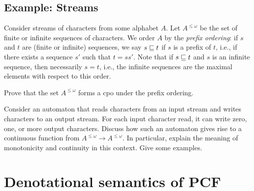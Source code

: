 \documentclass{article}
\begin{document}
\subsection{Example: Streams}

Consider streams of characters from some alphabet $A$. Let
$A^{\leq\omega}$ be the set of finite or infinite sequences of
characters. We order $A$ by the {\em prefix ordering}: if $s$ and $t$
are (finite or infinite) sequences, we say $s\sqsubseteq t$ if $s$ is a
prefix of $t$, i.e., if there exists a sequence $s'$ such that
$t=ss'$. Note that if $s\sqsubseteq t$ and $s$ is an infinite sequence,
then necessarily $s=t$, i.e., the infinite sequences are the maximal
elements with respect to this order.

\begin{exercise}
  Prove that the set $A^{\leq\omega}$ forms a cpo under the prefix
  ordering.
\end{exercise}

\begin{exercise}
  Consider an automaton that reads characters from an input stream
  and writes characters to an output stream. For each input character
  read, it can write zero, one, or more output characters. Discuss how
  such an automaton gives rise to a continuous function from
  $A^{\leq\omega}\to A^{\leq\omega}$. In particular, explain the
  meaning of monotonicity and continuity in this context. Give some
  examples. 
\end{exercise}

\section{Denotational semantics of PCF}
\end{document}
